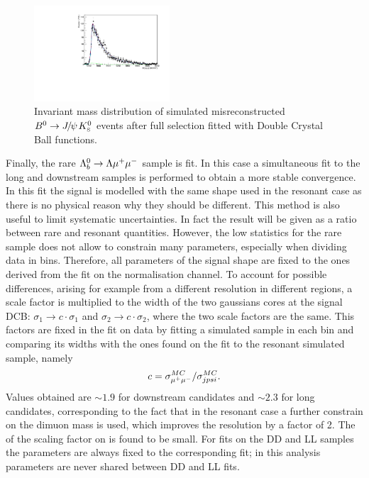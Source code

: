 \begin{figure}
\centering
\includegraphics[width=0.45\textwidth]{Lmumu/figs/MassFits/fitKS_bkg.pdf}
\caption{Invariant mass distribution of simulated misreconstructed $\Bz\ra\jpsi\KS$ events after full selection fitted with Double Crystal Ball functions. }
\label{fig:KSbkgFit}
\end{figure}

Finally, the rare $\Lambda^0_b\rightarrow\Lambda\mu^+\mu^-$ sample is fit. In this case a simultaneous fit to the long
and downstream samples is performed to obtain a more stable convergence. 
In this fit the signal is modelled with the same shape used in the resonant case as there is no physical
reason why they should be different. This method is also useful to limit systematic uncertainties.
In fact the result will be given as a ratio between rare and resonant quantities.
However, the low statistics for the rare sample does not allow to constrain many parameters,
especially when dividing data in \qsq bins. Therefore, all parameters of the signal shape are fixed to
the ones derived from the fit on the normalisation channel. To account for possible differences, arising
for example from a different resolution in different \qsq regions, a scale factor is multiplied
to the width of the two gaussians cores at the signal DCB: $\sigma_1 \rightarrow c\cdot \sigma_1$
and $\sigma_2 \rightarrow c\cdot \sigma_2$, where the two scale factors are the same. This factors
are fixed in the fit on data by fitting a \Lz\mumu simulated sample in each \qsq bin and comparing
its widths with the ones found on the fit to the resonant simulated sample, namely
\begin{equation}
c = \sigma_{\mu^+\mu^-}^{MC} / \sigma_{jpsi}^{MC}.
\end{equation}
Values obtained are $\sim 1.9$ for downstream candidates and $\sim 2.3$ for long candidates,
corresponding to the fact that in the resonant case a further constrain on the dimuon mass
is used, which improves the resolution by a factor of 2. The of the scaling factor on \qsq is found to be small.
For fits on the DD and LL samples the parameters are always fixed to the corresponding \jpsi fit;
in this analysis parameters are never shared between DD and LL fits.


